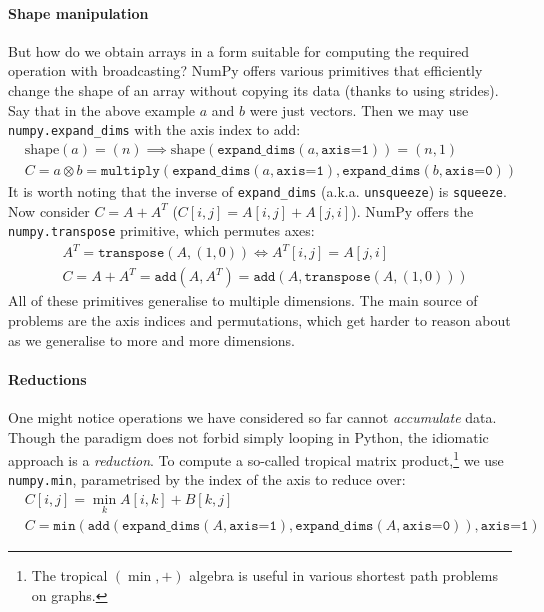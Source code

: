 \paragraph{Shape manipulation} But how do we obtain arrays in a form suitable for computing the required operation with broadcasting? NumPy offers various primitives that efficiently change the shape of an array without copying its data (thanks to using strides). Say that in the above example $a$ and $b$ were just vectors. Then we may use \texttt{numpy.expand\_dims} with the axis index to add:
\begin{align*}
&\mathrm{shape}(a) = (n) \implies \mathrm{shape}(\texttt{expand\_dims}(a, \texttt{axis=1})) = (n, 1) \\
&C = a \otimes b = \texttt{multiply} \left( \texttt{expand\_dims}(a, \texttt{axis=1}), \texttt{expand\_dims}(b, \texttt{axis=0}) \right)
\end{align*}
It is worth noting that the inverse of \texttt{expand\_dims} (a.k.a. \texttt{unsqueeze}) is \texttt{squeeze}. Now consider $C = A + A^T$ ($C[i, j] = A[i, j] + A[j, i]$). NumPy offers the \texttt{numpy.transpose} primitive, which permutes axes:
\begin{align*}
&A^T = \texttt{transpose}(A, (1, 0)) \iff A^T[i, j] = A[j, i] \\
&C = A + A^T = \texttt{add}(A, A^T) = \texttt{add}(A, \texttt{transpose}(A, (1, 0))) 
\end{align*}
All of these primitives generalise to multiple dimensions. 
The main source of problems are the axis indices and permutations, which get harder to reason about as we generalise to more and more dimensions. 

\paragraph{Reductions}
One might notice operations we have considered so far cannot \textit{accumulate} data. Though the paradigm does not forbid simply looping in Python, the idiomatic approach is a \textit{reduction}. To compute a so-called tropical matrix product,\footnote{The tropical $(\min, +)$ algebra is useful in various shortest path problems on graphs.} we use \texttt{numpy.min}, parametrised by the index of the axis to reduce over:
\begin{align*}
&C[i, j] = \min_k A[i, k] + B[k, j] \\
&C = \texttt{min} \left( \texttt{add} \left(\texttt{expand\_dims}(A, \texttt{axis=1}), \texttt{expand\_dims}(A, \texttt{axis=0}) \right), \texttt{axis=1} \right)
\end{align*}

